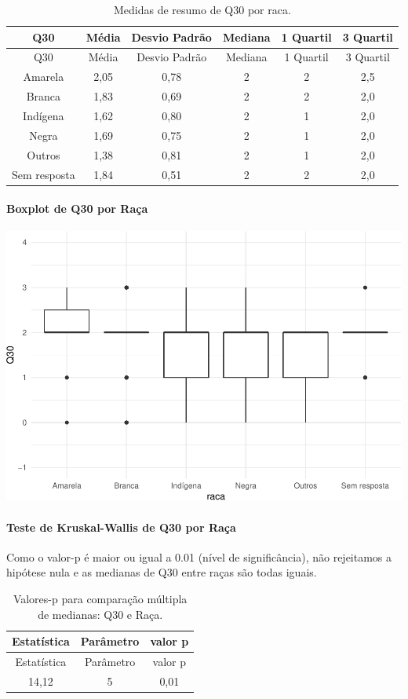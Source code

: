 \documentclass[]{article}
\let\oldparagraph\paragraph
\renewcommand{\paragraph}[1]{\oldparagraph{#1}\mbox{}}
\begin{document}
\begin{longtable}[]{@{}cccccc@{}}
\caption{\label{tab:unnamed-chunk-990}Medidas de resumo de Q30 por raca.}\tabularnewline
\toprule
Q30 & Média & Desvio Padrão & Mediana & 1 Quartil & 3 Quartil\tabularnewline
\midrule
\endfirsthead
\toprule
Q30 & Média & Desvio Padrão & Mediana & 1 Quartil & 3 Quartil\tabularnewline
\midrule
\endhead
Amarela & 2,05 & 0,78 & 2 & 2 & 2,5\tabularnewline
Branca & 1,83 & 0,69 & 2 & 2 & 2,0\tabularnewline
Indígena & 1,62 & 0,80 & 2 & 1 & 2,0\tabularnewline
Negra & 1,69 & 0,75 & 2 & 1 & 2,0\tabularnewline
Outros & 1,38 & 0,81 & 2 & 1 & 2,0\tabularnewline
Sem resposta & 1,84 & 0,51 & 2 & 2 & 2,0\tabularnewline
\bottomrule
\end{longtable}

\hypertarget{boxplot-de-q30-por-rauxe7a}{%
\paragraph{Boxplot de Q30 por Raça}\label{boxplot-de-q30-por-rauxe7a}}

\begin{center}\includegraphics[width=0.75\linewidth]{relatorio_covid19_files/figure-latex/unnamed-chunk-991-1} \end{center}

\hypertarget{teste-de-kruskal-wallis-de-q30-por-rauxe7a}{%
\paragraph{Teste de Kruskal-Wallis de Q30 por Raça}\label{teste-de-kruskal-wallis-de-q30-por-rauxe7a}}

Como o valor-p é maior ou igual a 0.01 (nível de significância), não rejeitamos a hipótese nula e as medianas de Q30 entre raças são todas iguais.

\begin{longtable}[]{@{}ccc@{}}
\caption{\label{tab:unnamed-chunk-993}Valores-p para comparação múltipla de medianas: Q30 e Raça.}\tabularnewline
\toprule
Estatística & Parâmetro & valor p\tabularnewline
\midrule
\endfirsthead
\toprule
Estatística & Parâmetro & valor p\tabularnewline
\midrule
\endhead
14,12 & 5 & 0,01\tabularnewline
\bottomrule
\end{longtable}
\end{document}
